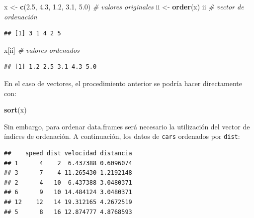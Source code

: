 \documentclass[
]{book}
\newenvironment{Shaded}{\begin{snugshade}}{\end{snugshade}}
\newcommand{\CommentTok}[1]{\textcolor[rgb]{0.56,0.35,0.01}{\textit{#1}}}
\newcommand{\FloatTok}[1]{\textcolor[rgb]{0.00,0.00,0.81}{#1}}
\newcommand{\FunctionTok}[1]{\textcolor[rgb]{0.13,0.29,0.53}{\textbf{#1}}}
\newcommand{\NormalTok}[1]{#1}
\newcommand{\OtherTok}[1]{\textcolor[rgb]{0.56,0.35,0.01}{#1}}
\newcommand{\SpecialCharTok}[1]{\textcolor[rgb]{0.81,0.36,0.00}{\textbf{#1}}}
\begin{document}
\begin{Shaded}
\begin{Highlighting}[]
\NormalTok{x }\OtherTok{\textless{}{-}} \FunctionTok{c}\NormalTok{(}\FloatTok{2.5}\NormalTok{, }\FloatTok{4.3}\NormalTok{, }\FloatTok{1.2}\NormalTok{, }\FloatTok{3.1}\NormalTok{, }\FloatTok{5.0}\NormalTok{) }\CommentTok{\# valores originales}
\NormalTok{ii }\OtherTok{\textless{}{-}} \FunctionTok{order}\NormalTok{(x)}
\NormalTok{ii    }\CommentTok{\# vector de ordenación}
\end{Highlighting}
\end{Shaded}

\begin{verbatim}
## [1] 3 1 4 2 5
\end{verbatim}

\begin{Shaded}
\begin{Highlighting}[]
\NormalTok{x[ii] }\CommentTok{\# valores ordenados}
\end{Highlighting}
\end{Shaded}

\begin{verbatim}
## [1] 1.2 2.5 3.1 4.3 5.0
\end{verbatim}

En el caso de vectores, el procedimiento anterior se podría
hacer directamente con:

\begin{Shaded}
\begin{Highlighting}[]
\FunctionTok{sort}\NormalTok{(x)}
\end{Highlighting}
\end{Shaded}

Sin embargo, para ordenar data.frames será necesario la utilización del
vector de índices de ordenación. A continuación, los datos de \texttt{cars}
ordenados por \texttt{dist}:

\begin{Shaded}
\end{Shaded}

\begin{verbatim}
##    speed dist velocidad distancia
## 1      4    2  6.437388 0.6096074
## 3      7    4 11.265430 1.2192148
## 2      4   10  6.437388 3.0480371
## 6      9   10 14.484124 3.0480371
## 12    12   14 19.312165 4.2672519
## 5      8   16 12.874777 4.8768593
\end{verbatim}
\end{document}
